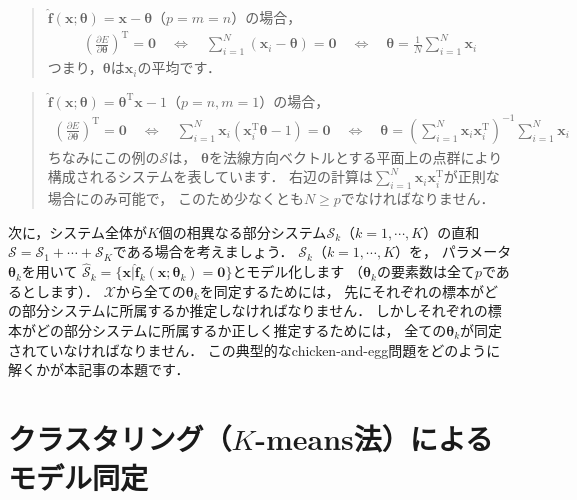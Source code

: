 ﻿\documentclass{jsarticle}
\begin{document}
\begin{quote}
$\hat{\bm{f}}(\bm{x};\bm{\theta})=\bm{x}-\bm{\theta}$（$p=m=n$）の場合，
\begin{align*}
\left(\frac{\partial E}{\partial\bm{\theta}}\right)^{\mathrm{T}}=\bm{0}
\quad\Leftrightarrow\quad
\sum_{i=1}^{N}(\bm{x}_{i}-\bm{\theta})=\bm{0}
\quad\Leftrightarrow\quad
\bm{\theta}=\frac{1}{N}\sum_{i=1}^{N}\bm{x}_{i}
\end{align*}
つまり，$\bm{\theta}$は$\bm{x}_{i}$の平均です．
\end{quote}
\begin{quote}
$\hat{\bm{f}}(\bm{x};\bm{\theta})=\bm{\theta}^{\mathrm{T}}\bm{x}-1$（$p=n, m=1$）の場合，
\begin{align*}
\left(\frac{\partial E}{\partial\bm{\theta}}\right)^{\mathrm{T}}=\bm{0}
\quad\Leftrightarrow\quad
\sum_{i=1}^{N}\bm{x}_{i}(\bm{x}_{i}^{\mathrm{T}}\bm{\theta}-1)=\bm{0}
\quad\Leftrightarrow\quad
\bm{\theta}=\left(\sum_{i=1}^{N}\bm{x}_{i}\bm{x}_{i}^{\mathrm{T}}\right)^{-1}\sum_{i=1}^{N}\bm{x}_{i}
\end{align*}
ちなみにこの例の$\mathcal{S}$は，
$\bm{\theta}$を法線方向ベクトルとする平面上の点群により構成されるシステムを表しています．
右辺の計算は$\sum_{i=1}^{N}\bm{x}_{i}\bm{x}_{i}^{\mathrm{T}}$が正則な場合にのみ可能で，
このため少なくとも$N\geq p$でなければなりません．
\end{quote}

次に，システム全体が$K$個の相異なる部分システム$\mathcal{S}_{k}$（$k=1,\cdots,K$）の直和
$\mathcal{S}=\mathcal{S}_{1}+\cdots+\mathcal{S}_{K}$である場合を考えましょう．
$\mathcal{S}_{k}$（$k=1,\cdots,K$）を，
パラメータ$\bm{\theta}_{k}$を用いて
$\hat{\mathcal{S}}_{k}=\{\bm{x}|\hat{\bm{f}}_{k}(\bm{x};\bm{\theta}_{k})=\bm{0}\}$とモデル化します
（$\bm{\theta}_{k}$の要素数は全て$p$であるとします）．
$\mathcal{X}$から全ての$\bm{\theta}_{k}$を同定するためには，
先にそれぞれの標本がどの部分システムに所属するか推定しなければなりません．
しかしそれぞれの標本がどの部分システムに所属するか正しく推定するためには，
全ての$\bm{\theta}_{k}$が同定されていなければなりません．
この典型的なchicken-and-egg問題をどのように解くかが本記事の本題です．


\section{クラスタリング（$K$-means法）によるモデル同定}
\end{document}
